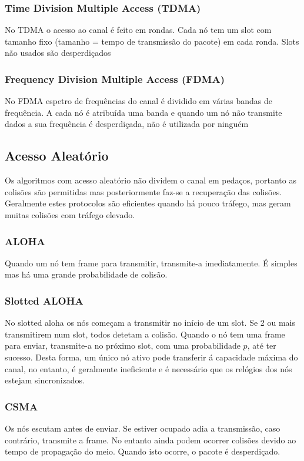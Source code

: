 \documentclass[10pt,a4paper]{report}
\begin{document}
\subsubsection{Time Division Multiple Access (TDMA)}
No TDMA o acesso ao canal é feito em rondas. Cada nó tem um slot com tamanho fixo (tamanho = tempo de transmissão do pacote) em cada ronda. Slots não usados são desperdiçados
\subsubsection{Frequency Division Multiple Access (FDMA)}
No FDMA espetro de frequências do canal é dividido em várias bandas de frequência. A cada nó é atribuída uma banda e quando um nó não transmite dados a sua frequência é desperdiçada, não é utilizada por ninguém 
\subsection{Acesso Aleatório}
Os algoritmos com acesso aleatório não dividem o canal em pedaços, portanto as colisões são permitidas mas posteriormente faz-se a recuperação das colisões. Geralmente estes protocolos são eficientes quando há pouco tráfego, mas geram muitas colisões com tráfego elevado.
\subsubsection{ALOHA}
Quando um nó tem frame para transmitir, transmite-a imediatamente. É simples mas há uma grande probabilidade de colisão.
\subsubsection{Slotted ALOHA}
No slotted aloha os nós começam a transmitir no início de um
slot. Se 2 ou mais transmitirem num slot, todos detetam a colisão. Quando o nó tem uma frame para enviar, transmite-a no próximo slot, com uma probabilidade $p$, até ter sucesso. Desta forma, um único nó ativo pode transferir á capacidade máxima do canal, no entanto, é geralmente ineficiente e é necessário que os relógios dos nós estejam sincronizados.
\subsubsection{CSMA}
Os nós escutam antes de enviar. Se estiver ocupado adia a transmissão, caso contrário, transmite a frame. No entanto ainda podem ocorrer colisões devido ao tempo de propagação do meio. Quando isto ocorre, o pacote é desperdiçado.
\end{document}
